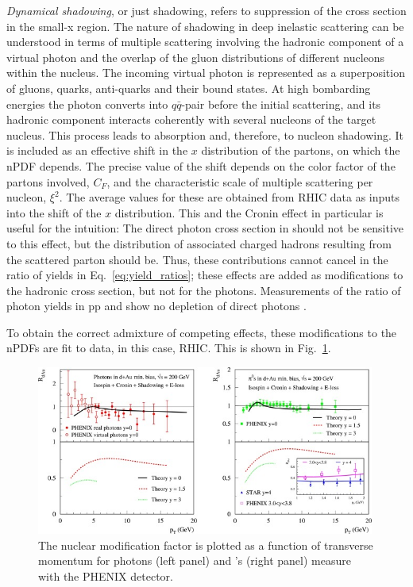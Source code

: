 \textit{Dynamical shadowing}, or just shadowing, refers to suppression of the cross section in the small-x region. The nature of shadowing in deep inelastic scattering can be understood in terms of multiple scattering involving the hadronic component of a virtual photon and the overlap of the gluon distributions of different nucleons within the nucleus. The incoming virtual photon is represented as a superposition of gluons, quarks, anti-quarks and their bound states. At high bombarding energies the photon converts into $q\bar{q}$-pair before the initial scattering, and its hadronic component interacts coherently with several nucleons of the target nucleus. This process leads to absorption and, therefore, to nucleon shadowing\cite{Tywoniuk2007}. It is included as an effective shift in the $x$ distribution of the partons, on which the nPDF depends. The precise value of the shift depends on the color factor of the partons involved, $C_F$, and the characteristic scale of multiple scattering per nucleon, $\xi^2$. The average values for these are obtained from RHIC data as inputs into the shift of the $x$ distribution\cite{Kang2012}.
This and the Cronin effect in particular is useful for the intuition: The direct photon cross section in \pPb should not be sensitive to this effect, but the distribution of associated charged hadrons resulting from the scattered parton should be. Thus, these contributions cannot cancel in the ratio of yields in Eq.~\ref{eq:yield_ratios}; these effects are added as modifications to the hadronic cross section, but not for the photons. Measurements of the ratio of photon yields in pp and \pPb show no depletion of direct photons \cite{Masson2019}.

To obtain the correct admixture of competing effects, these modifications to the nPDFs are fit to data, in this case, RHIC. This is shown in Fig.~\ref{fig:CNM_calc}. 

  \begin{figure}[htpb]
    \centering
    \includegraphics[width=0.99\textwidth]{CNM_cal.jpg}
    \caption{The nuclear modification factor is plotted as a function of transverse momentum for photons (left panel) and \pizero's (right panel) measure with the PHENIX detector.\cite{Kang2012}}
    \label{fig:CNM_calc}
  \end{figure}

